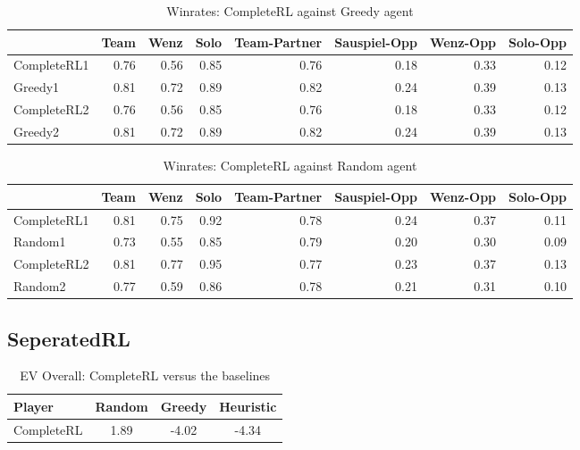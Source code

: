 \begin{table}
    \begin{tabular}{lrrrrrrr}
        \toprule
        {}          & Team & Wenz & Solo & Team-Partner & Sauspiel-Opp & Wenz-Opp & Solo-Opp \\
        \midrule
        CompleteRL1 & 0.76 & 0.56 & 0.85 & 0.76         & 0.18         & 0.33     & 0.12     \\
        Greedy1     & 0.81 & 0.72 & 0.89 & 0.82         & 0.24         & 0.39     & 0.13     \\
        CompleteRL2 & 0.76 & 0.56 & 0.85 & 0.76         & 0.18         & 0.33     & 0.12     \\
        Greedy2     & 0.81 & 0.72 & 0.89 & 0.82         & 0.24         & 0.39     & 0.13     \\
        \bottomrule
    \end{tabular}
    \caption{Winrates: CompleteRL against Greedy agent}
    \label{tab:greedyRL}
\end{table}

\begin{table}
    \begin{tabular}{lrrrrrrr}
        \toprule
        {}          & Team & Wenz & Solo & Team-Partner & Sauspiel-Opp & Wenz-Opp & Solo-Opp \\
        \midrule
        CompleteRL1 & 0.81 & 0.75 & 0.92 & 0.78         & 0.24         & 0.37     & 0.11     \\
        Random1     & 0.73 & 0.55 & 0.85 & 0.79         & 0.20         & 0.30     & 0.09     \\
        CompleteRL2 & 0.81 & 0.77 & 0.95 & 0.77         & 0.23         & 0.37     & 0.13     \\
        Random2     & 0.77 & 0.59 & 0.86 & 0.78         & 0.21         & 0.31     & 0.10     \\
        \bottomrule
    \end{tabular}
    \caption{Winrates: CompleteRL against Random agent}
    \label{tab:ranRL}
\end{table}

\subsection{SeperatedRL}
\begin{table}[]
    \centering
    \begin{tabular}{lccc}
        \toprule
        Player     & Random & Greedy & Heuristic \\
        \midrule
        CompleteRL & 1.89   & -4.02  & -4.34     \\
        \bottomrule
    \end{tabular}
    \caption{EV Overall: CompleteRL versus the baselines}
    \label{tab:evSeperateRL}
\end{table}

